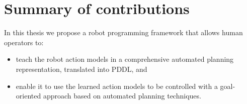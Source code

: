 \section{Summary of contributions}

In this thesis we propose a robot programming framework that allows human operators to:
\begin{itemize}
	\item teach the robot action models in a comprehensive automated planning representation, translated into PDDL, and
	\item enable it to use the learned action models to be controlled with a goal-oriented approach based on automated planning techniques.
\end{itemize}

